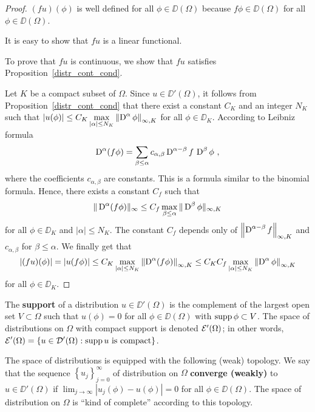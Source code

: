 \begin{proof}
 $(f u)(\phi)$ is well defined for all $\phi \in \DD(\Omega)$
because $f \phi \in \DD(\Omega)$ for all $\phi\in \DD(\Omega)$.

 It is easy to show that $f u$ is a linear functional.

 To prove that $f u$ is continuous, we show that $f u$
satisfies Proposition~\ref{distr_cont_cond}.

Let $K$ be a compact subset of $\Omega$.  Since $u\in \DD'(\Omega)$,
it follows from Proposition~\ref{distr_cont_cond} that there exist a
constant $C_K$ and an integer $N_K$ such that
$\displaystyle \left| u(\phi) \right| \leq C_K \max_{|\alpha|\leq N_K}
\left\| \operatorname{D}^\alpha \phi \right\|_{\infty,K}$ for all
$\phi \in \DD_K$.  According to Leibniz formula
\[
\operatorname{D}^\alpha (f \phi) = \sum_{\beta \leq \alpha} c_{\alpha,\beta}
\operatorname{D}^{\alpha-\beta}f \,\operatorname{D}^\beta \phi \ ,
\]
where the coefficients $c_{\alpha,\beta}$ are constants.  This is a formula
similar to the binomial formula.  Hence, there exists a constant $C_f$
such that
\[
\| \operatorname{D}^\alpha (f \phi) \|_{\infty} \leq C_f
\max_{\beta\leq\alpha} \|\operatorname{D}^\beta \phi\|_{\infty,K}
\]
for all $\phi \in \DD_K$ and $|\alpha|\leq N_K$.  The constant $C_f$
depends only of $\displaystyle \left\|\operatorname{D}^{\alpha-\beta} f\right\|_{\infty,K}$
and $c_{\alpha,\beta}$ for $\beta \leq \alpha$.
We finally get that
\[
\left| (f u)(\phi) \right| =
\left| u(f \phi) \right| \leq C_K \max_{|\alpha|\leq N_K}
\left\| \operatorname{D}^\alpha (f \phi) \right\|_{\infty,K}
\leq C_K C_f \max_{|\alpha|\leq N_K}
\left\| \operatorname{D}^\alpha \phi \right\|_{\infty,K}
\]
for all $\phi \in \DD_K$.
\end{proof}

The {\bfseries support} of a distribution
$u\in \DD'(\Omega)$ is the complement of the largest open set
$V\subset \Omega$ such that $u(\phi)=0$ for all $\phi \in \DD(\Omega)$ with
$\operatorname{supp} \phi \subset V$.  The space of distributions on $\Omega$
with compact support is denoted $\mathcal{E}'(\Omega)$; in other words,
$\displaystyle \mathcal{E}'(\Omega) = \left\{ u \in \mathcal{D}'(\Omega) : \operatorname{supp} u
\text{ is compact} \right\}$.

The space of distributions is equipped with the following (weak) topology.
We say that the sequence
$\displaystyle \left\{ u_j\right\}_{j=0}^\infty$ of distribution on
$\Omega$ {\bfseries converge (weakly)} to
$u\in \DD'(\Omega)$ if
$\displaystyle \lim_{j\rightarrow \infty} \left|u_j(\phi) - u(\phi) \right| = 0$
for all $\phi \in \DD(\Omega)$.  The space of distribution on $\Omega$
is ``kind of complete'' according to this topology.

